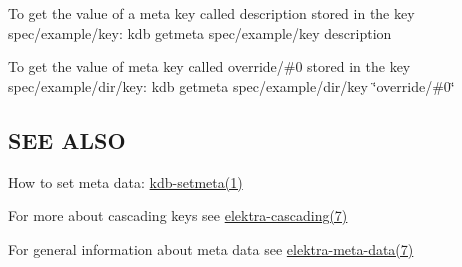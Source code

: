 To get the value of a meta key called {\ttfamily description} stored in the key {\ttfamily spec/example/key}\+: {\ttfamily kdb getmeta spec/example/key description}

To get the value of meta key called {\ttfamily override/\#0} stored in the key {\ttfamily spec/example/dir/key}\+: {\ttfamily kdb getmeta spec/example/dir/key \char`\"{}override/\#0\char`\"{}}

\subsection*{S\+E\+E A\+L\+S\+O}


\begin{DoxyItemize}
\item How to set meta data\+: \hyperlink{md_doc_help_kdb-setmeta_doc_help_kdb-setmeta_md}{kdb-\/setmeta(1)}
\item For more about cascading keys see \hyperlink{md_doc_help_elektra-cascading_doc_help_elektra-cascading_md}{elektra-\/cascading(7)}
\item For general information about meta data see \hyperlink{md_doc_help_elektra-meta-data_doc_help_elektra-meta-data_md}{elektra-\/meta-\/data(7)} 
\end{DoxyItemize}